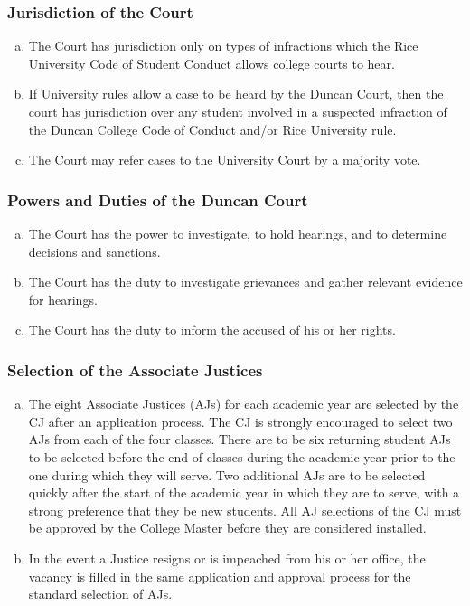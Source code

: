 \documentclass[USletter,12pt]{article}
\begin{document}
\begin{enumerate}[(a)]
\subsubsection{Jurisdiction of the Court}
\begin{enumerate}[(a)]
\item The Court has jurisdiction only on types of infractions which the Rice University Code of Student Conduct allows college courts to hear.  
\item If University rules allow a case to be heard by the Duncan Court, then the court has jurisdiction over any student involved in a suspected infraction of the Duncan College Code of Conduct and/or Rice University rule.
\item The Court may refer cases to the University Court by a majority vote.
\end{enumerate}

\subsubsection{Powers and Duties of the Duncan Court}
\begin{enumerate}[(a)]
\item The Court has the power to investigate, to hold hearings, and to determine decisions and sanctions.
\item The Court has the duty to investigate grievances and gather relevant evidence for hearings.
\item The Court has the duty to inform the accused of his or her rights.
\end{enumerate}

\subsubsection{Selection of the Associate Justices}
\begin{enumerate}[(a)]
\item The eight Associate Justices (AJs) for each academic year are selected by the CJ after an application process.  The CJ is strongly encouraged to select two AJs from each of the four classes.  There are to be six returning student AJs to be selected before the end of classes during the academic year prior to the one during which they will serve.  Two additional AJs are to be selected quickly after the start of the academic year in which they are to serve, with a strong preference that they be new students.  All AJ selections of the CJ must be approved by the College Master before they are considered installed.
\item In the event a Justice resigns or is impeached from his or her office, the vacancy is filled in the same application and approval process for the standard selection of AJs.
\end{enumerate}


\end{enumerate}
\end{document}
